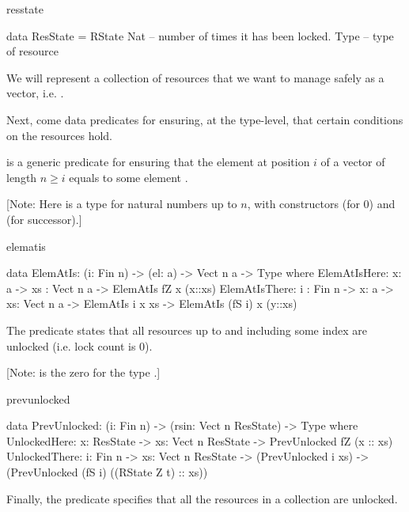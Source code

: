 \begin{SaveVerbatim}{resstate}

data ResState = RState Nat  -- number of times it has been locked.
                       Type -- type of resource

\end{SaveVerbatim}

We will represent a collection of resources that we want to manage safely as a
vector, i.e. .

Next, come data predicates for ensuring, at the type-level, that certain
conditions on the resources hold.

 is a generic predicate for ensuring that the element at
position $i$ of a vector of length $n \geq i$ equals to some element .

[Note: Here  is a type for natural numbers up to $n$, with constructors
 (for $0$) and  (for successor).]

\begin{SaveVerbatim}{elematis}

data ElemAtIs: (i: Fin n) -> (el: a) -> Vect n a -> Type where
  ElemAtIsHere:  {x: a} -> {xs : Vect n a} -> ElemAtIs fZ x (x::xs)
  ElemAtIsThere: {i : Fin n} -> {x: a} -> {xs: Vect n a} ->
                                ElemAtIs i x xs ->
                                ElemAtIs (fS i) x (y::xs)

\end{SaveVerbatim}


The  predicate states that all resources up to and including
some index are unlocked (i.e. lock count is 0).

[Note:  is the zero for the type .]

\begin{SaveVerbatim}{prevunlocked}

data PrevUnlocked: (i: Fin n) -> (rsin: Vect n ResState) -> Type where
   UnlockedHere: {x: ResState} -> {xs: Vect n ResState} ->
                     PrevUnlocked fZ (x :: xs)
   UnlockedThere: {i: Fin n} -> {xs: Vect n ResState} ->
                                (PrevUnlocked i xs) ->
                                (PrevUnlocked (fS i) ((RState Z t) :: xs))
\end{SaveVerbatim}

Finally, the  predicate specifies that all the resources in a
collection are unlocked.


